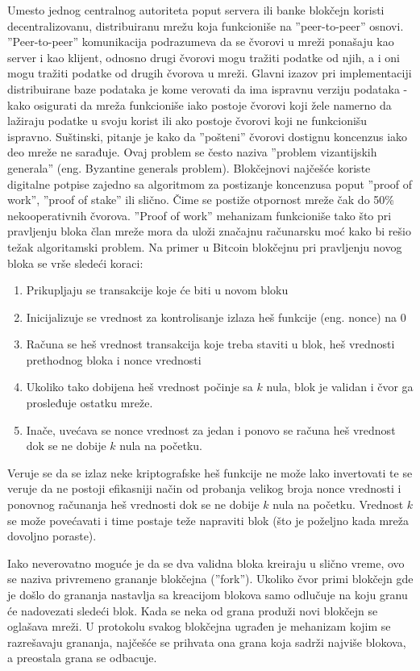 \documentclass[a4paper]{article}
\begin{document}
Umesto jednog centralnog autoriteta poput servera ili banke blokčejn koristi decentralizovanu, distribuiranu mrežu
koja funkcioniše na ''peer-to-peer'' osnovi. ''Peer-to-peer'' komunikacija podrazumeva da se čvorovi u mreži ponašaju
kao server i kao klijent, odnosno drugi čvorovi mogu tražiti podatke od njih, a i oni mogu tražiti podatke od drugih čvorova u mreži.
Glavni izazov pri implementaciji distribuirane baze podataka je kome verovati da ima ispravnu verziju podataka -
kako osigurati da mreža funkcioniše iako postoje čvorovi koji žele namerno da lažiraju podatke
u svoju korist ili ako postoje čvorovi koji ne funkcionišu ispravno. Suštinski, pitanje je kako da
''pošteni'' čvorovi dostignu koncenzus iako deo mreže ne sarađuje. Ovaj problem se često naziva ''problem vizantijskih generala'' (eng. Byzantine generals problem).
Blokčejnovi najčešće koriste digitalne potpise zajedno sa algoritmom za postizanje koncenzusa poput ''proof of work'', ''proof of stake'' ili slično.
Čime se postiže otpornost mreže čak do 50\% nekooperativnih čvorova.
''Proof of work'' mehanizam funkcioniše tako što pri pravljenju bloka član mreže mora da uloži značajnu računarsku
moć kako bi rešio težak algoritamski problem. Na primer u Bitcoin blokčejnu pri pravljenju novog bloka se vrše sledeći koraci:
\begin{enumerate}
    \item Prikupljaju se transakcije koje će biti u novom bloku
    \item Inicijalizuje se vrednost za kontrolisanje izlaza heš funkcije (eng. nonce) na 0
    \item Računa se heš vrednost transakcija koje treba staviti u blok, heš vrednosti prethodnog bloka i nonce vrednosti
    \item Ukoliko tako dobijena heš vrednost počinje sa $k$ nula, blok je validan i čvor ga prosleđuje ostatku mreže.
    \item Inače, uvećava se nonce vrednost za jedan i ponovo se računa heš vrednost dok se ne dobije $k$ nula na početku.
\end{enumerate}
Veruje se da se izlaz neke kriptografske heš funkcije ne može lako invertovati te se veruje da ne postoji
efikasniji način od probanja velikog broja nonce vrednosti i ponovnog računanja heš vrednosti dok se
ne dobije $k$ nula na početku.
Vrednost $k$ se može povećavati i time postaje teže napraviti blok (što je poželjno kada mreža dovoljno poraste).

Iako neverovatno moguće je da se dva validna bloka kreiraju u slično vreme, ovo se naziva privremeno grananje blokčejna (''fork'').
Ukoliko čvor primi blokčejn gde je došlo do grananja nastavlja sa kreacijom blokova samo odlučuje na koju granu će nadovezati sledeći blok.
Kada se neka od grana produži novi blokčejn se oglašava mreži. U protokolu svakog blokčejna ugrađen je mehanizam kojim se razrešavaju grananja,
najčešće se prihvata ona grana koja sadrži najviše blokova, a preostala grana se odbacuje.
\end{document}
